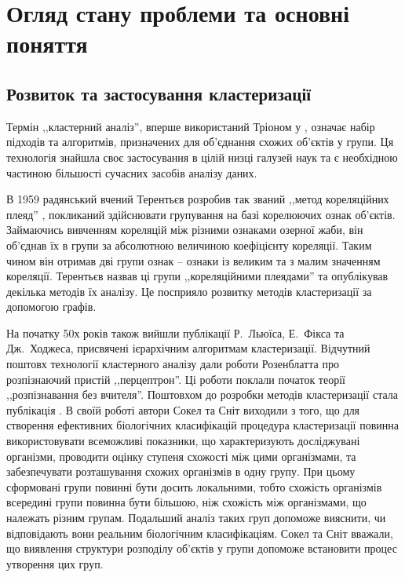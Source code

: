 \chapter{Огляд стану проблеми та основні поняття}\label{ch:01}

\section{Розвиток та застосування кластеризації}
    Термін ,,кластерний аналіз'', вперше використаний Тріоном у \cite{Tryon:Cluster:1939}, означає набір підходів та алгоритмів, призначених для об'єднання схожих об'єктів у групи. Ця технологія знайшла своє застосування в цілій низці галузей наук та є необхідною частиною більшості сучасних засобів аналізу даних.
 
    В 1959 радянський вчений Терентьєв розробив так званий ,,метод кореляційних плеяд'' \cite{Terentyev}, покликаний здійснювати групування на базі корелюючих ознак об'єктів. Займаючись вивченням кореляцій між різними ознаками озерної жаби, він об'єднав їх в групи за абсолютною величиною коефіцієнту кореляції. Таким чином він отримав дві групи ознак -- ознаки із великим та з малим значенням кореляції. Терентьєв назвав ці групи ,,кореляційними плеядами'' та опублікував декілька методів їх аналізу. Це посприяло розвитку методів кластеризації за допомогою графів.
    
    На початку 50х років також вийшли публікації Р.~Льюїса, Е.~Фікса та Дж.~Ходжеса, присвячені ієрархічним алгоритмам кластеризації. Відчутний поштовх технології кластерного аналізу дали роботи Розенблатта про розпізнаючий пристій ,,перцептрон''. Ці роботи поклали початок теорії ,,розпізнавання без вчителя''. Поштовхом до розробки методів кластеризації стала публікація \cite{SokalSneath}. В своїй роботі автори Сокел та Сніт виходили з того, що для створення ефективних біологічних класифікацій процедура кластеризації повинна використовувати всеможливі показники, що характеризують досліджувані організми, проводити оцінку ступеня схожості між цими організмами, та забезпечувати розташування схожих організмів в одну групу. При цьому сформовані групи повинні бути досить локальними, тобто схожість організмів всередині групи повинна бути більшою, ніж схожість між організмами, що належать різним групам. Подальший аналіз таких груп допоможе вияснити, чи відповідають вони реальним біологічним класифікаціям. Сокел та Сніт вважали, що виявлення структури розподілу об'єктів у групи допоможе встановити процес утворення цих груп.
    

